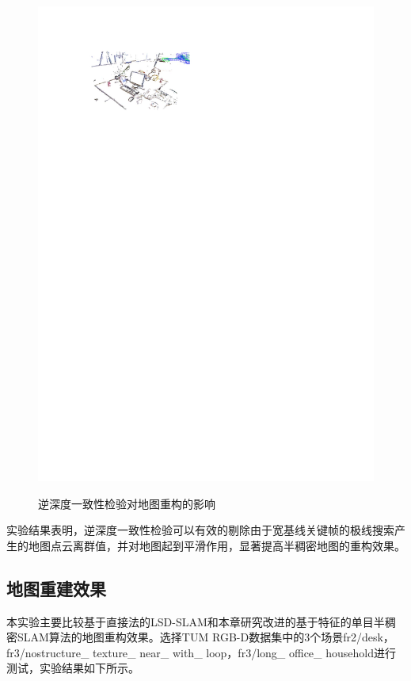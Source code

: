 \begin{figure}[h]
{          \includegraphics[scale=1]{figures/Fig4-3_b.pdf}
          }
     \caption{逆深度一致性检验对地图重构的影响}
\label{fig4.3}
\end{figure}

实验结果表明，逆深度一致性检验可以有效的剔除由于宽基线关键帧的极线搜索产生的地图点云离群值，并对地图起到平滑作用，显著提高半稠密地图的重构效果。

\subsection{地图重建效果}
本实验主要比较基于直接法的LSD-SLAM和本章研究改进的基于特征的单目半稠密SLAM算法的地图重构效果。选择TUM RGB-D数据集中的3个场景fr2/desk，fr3/nostructure\_ texture\_ near\_ with\_ loop，fr3/long\_ office\_ household进行测试，实验结果如下所示。


